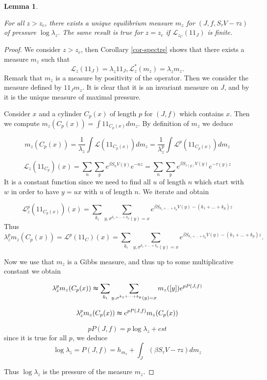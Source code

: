 \documentclass[11 pt]{article}
\newtheorem{lemma}[proposition]{Lemma}
\newcommand {\CL}{{\mathcal L}}
\newcommand{\BBone}{{1\!\!1}}
\theoremstyle{definition}
\begin{document}
\begin{lemma}\label{lem-pression-retour}


For all $z>z_c$, there exists a unique equilibrium measure $m_z$ for $(J,f,S_{\tau}V-\tau z)$ of pressure $\log \lambda_z$.
The same result is true for $z=z_c$ if $\CL_{z_C}(\BBone_J)$ is finite.
\end{lemma}
\begin{proof}
We  consider  $z>z_c$, then Corollary \ref{cor-spectre} shows that there exists a measure $m_z$ such that $$\CL_z(\BBone_J)=\lambda_z \BBone_J, \CL_z^*(m_z)=\lambda_zm_z.$$ 
Remark that $m_z$ is a measure by positivity of the operator.
Then we consider the measure defined by $\BBone_J m_z$. It is clear that it is an invariant measure on $J$, and by \cite{Baladi} it is the unique measure of maximal pressure.


Consider $x$ and a cylinder $C_p(x)$  of length $p$ for $(J,f)$ which contains $x$. Then we compute
$m_z(C_p(x))=\int 1\!\!1_{C_p(x)}dm_z$. By definition of $m_z$ we deduce 

$$
m_z(C_p(x))=\frac{1}{\lambda_z}\int \CL(1\!\!1_{C_p(x)})dm_z=\frac{1}{\lambda_z^p}\int \CL^p(1\!\!1_{C_p(x)})dm_z$$

$$\CL_z(1\!\!1_{C_p})(x)=\sum_n\sum_y e^{\beta S_n V(y)} e^{-nz}=\sum_n\sum_ye^{\beta S_{\tau(y)}V(y)}e^{-\tau(y)z}$$
It is a constant function since we need to find all $u$ of length $n$ which start with $w$ in order to have $y=ux$ with $u$ of length $n$.
We iterate and obtain


$$\CL^p_z(1\!\!1_{C_p(x)})(x)=\sum_{k_i}\sum_{y, \sigma^{k_1+\dots+k_p}(y)=x}e^{\beta S_{k_1+\dots+k_p}V(y)-(k_1+\dots+k_p)z} $$
Thus 
\begin{equation}\label{eq-pression-m}
\lambda_z^p m_z(C_p(x))=\CL^p(1\!\!1_C)(x)=\sum_{k_i}\sum_{y, \sigma^{k_1+\dots+k_p}(y)=x}e^{\beta S_{k_1+\dots+k_p}V(y)-(k_1+\dots+k_p)z}.
\end{equation}

Now we use that $m_z$ is a Gibbs measure, and thus up to some multiplicative constant we obtain

$$\lambda_z^p m_z(C_p(x))\thickapprox \sum_{k_i}\sum_{y, \sigma^{k_1+\dots+k_p}(y)=x}m_z([y])e^{pP(J,f)} $$

$$\lambda_z^p m_z(C_p(x))\thickapprox  e^{p P(J,f)} m_z(C_p(x))$$

$$pP(J,f)=p\log \lambda_z+cst$$
since it is true for all $p$, we deduce
$$\log \lambda_z=P(J,f)=h_{m_z}+\int_J (\beta S_{\tau}V -\tau z)d m_z$$

Thus $\log\lambda_z$ is the pressure of the measure $m_z$.
\end{proof}
\end{document}
